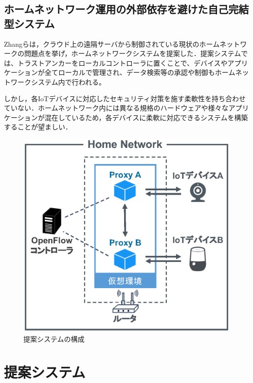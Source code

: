 \documentclass[Japanese]{dicomopapers}
\begin{document}
\subsection{ホームネットワーク運用の外部依存を避けた自己完結型システム}
Zhangらは，クラウド上の遠隔サーバから制御されている現状のホームネットワークの問題点を挙げ，ホームネットワークシステムを提案した\cite{sover}．提案システムでは、トラストアンカーをローカルコントローラに置くことで、デバイスやアプリケーションが全てローカルで管理され、データ検索等の承認や制御もホームネットワークシステム内で行われる。\par
しかし，各IoTデバイスに対応したセキュリティ対策を施す柔軟性を持ち合わせていない．ホームネットワーク内には異なる規格のハードウェアや様々なアプリケーションが混在しているため，各デバイスに柔軟に対応できるシステムを構築することが望ましい．

\begin{figure}[!tb]
	\centering
	\includegraphics[width=\linewidth]{img/system.eps}
	\caption{提案システムの構成}
	\label{fig:system}
\end{figure}

\section{提案システム}
\end{document}
